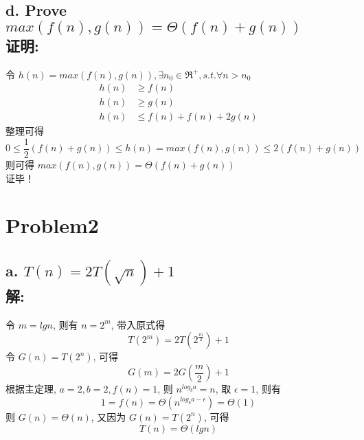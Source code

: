 \documentclass[12pt]{article}
\begin{document}
    \subsection*{d. Prove $ max(f(n),g(n)) = \Theta(f(n)+g(n)) $ \\\textbf{证明:}}
      令 $ h(n)=max(f(n),g(n)), \exists n_0 \in \Re^+, s.t. \forall n>n_0 $
      \begin{align}
      	h(n) &\geq f(n)\\
        h(n) &\geq g(n)\\
        h(n) &\leq f(n)+f(n)+2g(n)
      \end{align}
      整理可得
      \begin{equation}
        0 \leq \frac{1}{2}(f(n)+g(n)) \leq h(n) = max(f(n),g(n)) \leq 2(f(n)+g(n))
      \end{equation}
      则可得 $ max(f(n),g(n)) = \Theta(f(n)+g(n)) $\\
      证毕！
  \section*{Problem2}
    \subsection*{a. $ T(n)=2T(\sqrt{n})+1 $ \\\textbf{解:}}
      令 $ m=lgn $, 则有 $ n=2^m $, 带入原式得
      \begin{equation}
        T(2^m)=2T(2^{\frac{m}{2}})+1
      \end{equation}
      令 $ G(n)=T(2^n) $, 可得
      \begin{equation}
        G(m)=2G(\frac{m}{2})+1
      \end{equation}
      根据主定理, $ a=2, b=2, f(n)=1 $, 则 $ n^{log_ba}=n $, 取 $ \epsilon=1 $, 则有
      \begin{equation}
        1=f(n)=\Theta(n^{log_ba-\epsilon})=\Theta(1)
      \end{equation}
      则 $ G(n)=\Theta(n) $, 又因为 $ G(n)=T(2^n) $, 可得
      \begin{equation}
        T(n)=\Theta(lgn)
      \end{equation}
\end{document}
